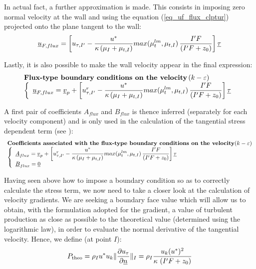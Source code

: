 In actual fact, a further approximation is made. This consists in imposing
zero normal velocity at the wall and using the equation (\ref{eq_uf_flux_clptur})
projected onto the plane tangent to the wall:
\begin{equation}
\underline{u}_{F,flux}=\left[u_{\tau,I'}-\displaystyle\frac{u^*}{\kappa\,
(\mu_I+\mu_{t,I})} max(\mu_{t}^{lm},\mu_{t,I}) \, \displaystyle\frac {I'F} {\left(I'F+z_0 \right)} \right]\underline{\tau}
\end{equation}

Lastly, it is also possible to make the wall velocity appear in the final expression:
\begin{equation}
\begin{array}{l}
\text{\bf Flux-type boundary conditions on the velocity}\,(k-\varepsilon)\\
\left\{\begin{array}{l}
\underline{u}_{F,flux}=\underline{v}_p+\left[u^r_{\tau,I'}-\displaystyle\frac{u^*}{\kappa\,
(\mu_I+\mu_{t,I})} max(\mu_{t}^{lm},\mu_{t,I})  \, \displaystyle\frac {I'F} {\left(I'F+z_0 \right)}\right]\underline{\tau}
\end{array}\right.\\
\end{array}
\end{equation}

A first pair of coefficients $A_{flux}$ and $B_{flux}$ is thence inferred (separately
for each velocity component) and is only used in the calculation of the tangential
stress dependent term (see ):
\begin{equation}
\begin{array}{l}
\text{\bf Coefficients associated with the flux-type boundary conditions on the
velocity} (k-\varepsilon)\\
\left\{\begin{array}{l}
\underline{A}_{flux}=\underline{v}_p+\left[u^r_{\tau,I'}-\displaystyle\frac{u^*}{\kappa\,
(\mu_I+\mu_{t,I})} max(\mu_{t}^{lm},\mu_{t,I}) \, \displaystyle\frac {I'F} {\left(I'F+z_0 \right)} \right]\underline{\tau} \\
\underline{B}_{flux} = \underline{0}
\end{array}\right.
\end{array}
\end{equation}

Having seen above how to impose a boundary condition so as to correctly calculate the stress term,
we now need to take a closer look at the calculation of velocity gradients. We are seeking a
boundary face value which will allow us to obtain, with the formulation adopted for the gradient,
a value of turbulent production as close as possible to the theoretical value (determined using the
logarithmic law), in order to evaluate the normal derivative of the tangential velocity.
Hence, we define (at point $I$):
\begin{equation}\label{eq_ptheo_clptur}
P_{\text{theo}} = \rho_I u^* u_k
\|\displaystyle\frac{\partial u_\tau}{\partial\underline{n}}\|_{I} =
\rho_I \displaystyle\frac{u_k(u^*)^2}{\kappa\, \left(I'F+z_0 \right)}
\end{equation}

